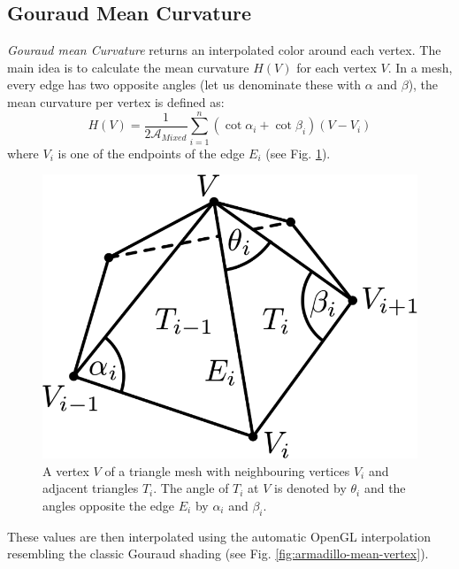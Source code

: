 \subsection{Gouraud Mean Curvature}
\textit{Gouraud mean Curvature} returns an interpolated color around each vertex. The main idea is to calculate the mean curvature $H(V)$ for each vertex $V$. In a mesh, every edge has two opposite angles (let us denominate these with $\alpha$ and $\beta$), the mean curvature per vertex is defined as:
$$H(V) = \frac{1}{2\mathcal{A}_{Mixed}} \sum_{i=1}^{n}(\cot \alpha_i + \cot \beta_i) (V - V_i)$$
where $V_i$ is one of the endpoints of the edge $E_i$ (see Fig. \ref{fig:mean-edge-cot}).
\begin{figure}[H]
    \centering
    \includegraphics[scale=0.6]{images/mean-edge-cot.png}
    \caption{A vertex $V$ of a triangle mesh with neighbouring vertices $V_i$ and adjacent triangles $T_i$. The angle of $T_i$ at $V$ is denoted by $\theta_i$ and the angles opposite the edge $E_i$ by $\alpha_i$ and $\beta_i$. \cite{geometryprocessing}}\label{fig:mean-edge-cot}
\end{figure}

These values are then interpolated using the automatic OpenGL interpolation resembling the classic Gouraud shading (see Fig. \ref{fig:armadillo-mean-vertex}).


